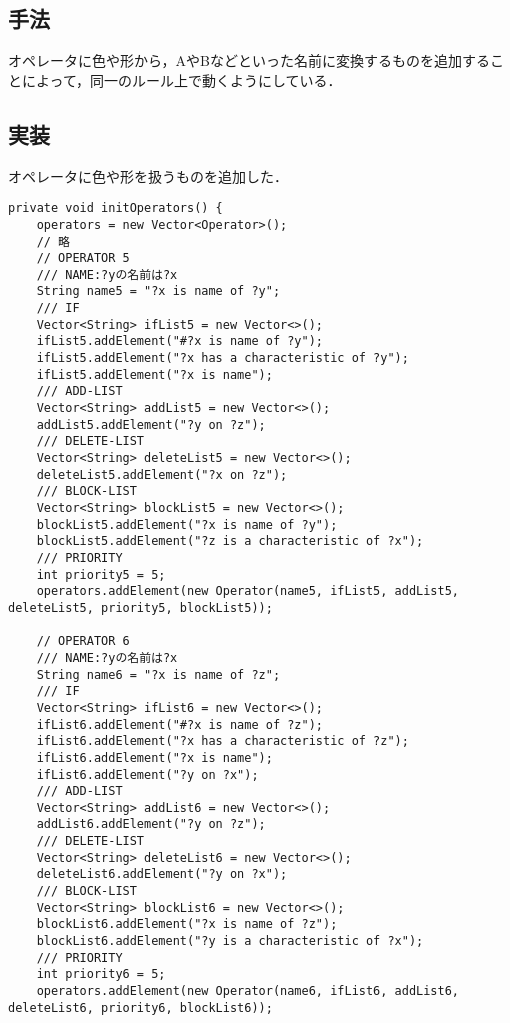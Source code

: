 \documentclass{jarticle}
\begin{document}
\subsection{手法}
オペレータに色や形から，AやBなどといった名前に変換するものを追加することによって，同一のルール上で動くようにしている．

\subsection{実装}
オペレータに色や形を扱うものを追加した．
\begin{lstlisting}[caption=色や形を扱うオペレータ,label=src:operator]
private void initOperators() {
    operators = new Vector<Operator>();
    // 略
    // OPERATOR 5
    /// NAME:?yの名前は?x
    String name5 = "?x is name of ?y";
    /// IF
    Vector<String> ifList5 = new Vector<>();
    ifList5.addElement("#?x is name of ?y");
    ifList5.addElement("?x has a characteristic of ?y");
    ifList5.addElement("?x is name");
    /// ADD-LIST
    Vector<String> addList5 = new Vector<>();
    addList5.addElement("?y on ?z");
    /// DELETE-LIST
    Vector<String> deleteList5 = new Vector<>();
    deleteList5.addElement("?x on ?z");
    /// BLOCK-LIST
    Vector<String> blockList5 = new Vector<>();
    blockList5.addElement("?x is name of ?y");
    blockList5.addElement("?z is a characteristic of ?x");
    /// PRIORITY
    int priority5 = 5;
    operators.addElement(new Operator(name5, ifList5, addList5, deleteList5, priority5, blockList5));
    
    // OPERATOR 6
    /// NAME:?yの名前は?x
    String name6 = "?x is name of ?z";
    /// IF
    Vector<String> ifList6 = new Vector<>();
    ifList6.addElement("#?x is name of ?z");
    ifList6.addElement("?x has a characteristic of ?z");
    ifList6.addElement("?x is name");
    ifList6.addElement("?y on ?x");
    /// ADD-LIST
    Vector<String> addList6 = new Vector<>();
    addList6.addElement("?y on ?z");
    /// DELETE-LIST
    Vector<String> deleteList6 = new Vector<>();
    deleteList6.addElement("?y on ?x");
    /// BLOCK-LIST
    Vector<String> blockList6 = new Vector<>();
    blockList6.addElement("?x is name of ?z");
    blockList6.addElement("?y is a characteristic of ?x");
    /// PRIORITY
    int priority6 = 5;
    operators.addElement(new Operator(name6, ifList6, addList6, deleteList6, priority6, blockList6));
    

\end{lstlisting}
\end{document}

